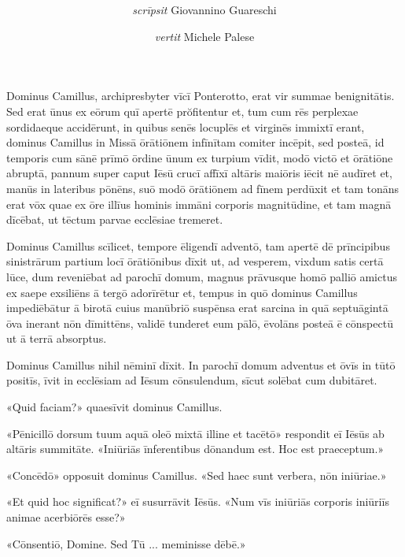 \documentclass[a4paper, 12pt]{article}
\title{
	\MyTitle
}
\author{\textit{scrīpsit} Giovannino Guareschi \and \textit{vertit} Michele Palese}
\date{}
\begin{document}
	
	\maketitle
	
	Dominus Camillus, archipresbyter vīcī Ponterotto, erat vir summae benignitātis.
	Sed erat ūnus ex eōrum quī apertē prŏfitentur et, tum cum rēs perplexae sordidaeque accidērunt, in quibus senēs locuplēs et virginēs immixtī erant, dominus Camillus in Missā ōrātiōnem infīnītam comiter incēpit, sed posteā, id temporis cum sānē prīmō ōrdine ūnum ex turpium vīdit, modō victō et ōrātiōne abruptā, pannum super caput Iēsū crucī affīxī altāris maiōris iēcit nē audīret et, manūs in lateribus pōnēns, suō modō ōrātiōnem ad fīnem perdūxit et tam tonāns erat vōx quae ex ōre illīus hominis immāni corporis magnitūdine, et tam magnā dīcēbat, ut tēctum parvae ecclēsiae tremeret.
	
	Dominus Camillus scīlicet, tempore ēligendī adventō, tam apertē dē prīncipibus sinistrārum partium locī ōrātiōnibus dīxit ut, ad vesperem, vixdum satis certā lūce, dum reveniēbat ad parochī domum, magnus prāvusque homō palliō amictus ex saepe exsiliēns ā tergō adorīrētur et, tempus in quō dominus Camillus impediēbātur ā birotā cuius manūbriō suspēnsa erat sarcina in quā septuāgintā ōva inerant nōn dīmittēns, validē tunderet eum pālō, ēvolāns posteā ē cōnspectū ut ā terrā absorptus.
	
	Dominus Camillus nihil nēminī dīxit.
	In parochī domum adventus et ōvīs in tūtō positīs, īvit in ecclēsiam ad Iēsum cōnsulendum, sīcut solēbat cum dubitāret.
	
	«Quid faciam?» quaesīvit dominus Camillus.
	
	«Pēnicillō dorsum tuum aquā oleō mixtā illine et tacētō» respondit eī Iēsūs ab altāris summitāte.
	«Iniūriās īnferentibus dōnandum est. Hoc est praeceptum.»
	
	«Concēdō» opposuit dominus Camillus. «Sed haec sunt verbera, nōn iniūriae.»
	
	«Et quid hoc significat?» eī susurrāvit Iēsūs. «Num vīs iniūriās corporis iniūriīs animae acerbiōrēs esse?»
	
	«Cōnsentiō, Domine. Sed Tū ... meminisse dēbē.»
	
\end{document}
